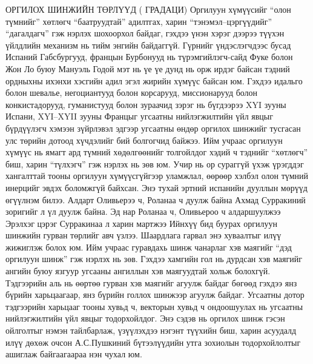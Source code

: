 ОРГИЛОХ ШИНЖИЙН ТӨРЛҮҮД ( ГРАДАЦИ)
Оргилуун хүмүүсийг “олон түмнийг” хөтлөгч “баатруудтай” адилтгах, харин “тэнэмэл–цэргүүдийг” “дагалдагч” гэж нэрлэх шохоорхол байдаг, гэхдээ үнэн хэрэг дээрээ түүхэн үйлдлийн механизм нь тийм энгийн байдаггүй. Гүрнийг үндэслэгчдээс бусад Испаний Габсбургууд, францын Бурбонууд нь түрэмгийлэгч-сайд Фуке болон Жон Ло буюу Мануэль Годой мэт нь үе үе дунд нь орж ирдэг байсан тэдний ордныхны ихэнхи хэсгийн адил эгэл жирийн хүмүүс байсан юм. Гэхдээ идальго болон шевалье, негоциантууд болон корсарууд, миссионарууд болон конкистадорууд, гуманистууд болон зураачид зэрэг нь бүгдээрээ XYI зууны Испани, XYI–XYII зууны Францыг угсаатны нийлэгжилтийн үйл явцыг бүрдүүлэгч хэмээн зүйрлэвэл эдгээр угсаатны өндөр оргилох шинжийг тусгасан улс төрийн дотоод хүчдэлийг бий болгогчид байжээ.
Ийм учраас оргилуун хүмүүс нь ямагт ард түмний хөдөлгөөнийг толгойлдог хэдий ч тэднийг “хөтлөгч” биш, харин “түлхэгч” гэж нэрлэх нь зөв юм. Учир нь ор сураггүй үхэж үрэгддэг хангалттай тооны оргилуун хүмүүсгүйгээр уламжлал, өөрөөр хэлбэл олон түмний инерцийг эвдэх боломжгүй байхсан. Энэ тухай эртний испанийн дууллын мөрүүд өгүүлнэм билээ.
Алдарт Оливьерээ ч, Роланаа ч дуулж байна
Ахмад Сурракиний зоригийг л үл дуулж байна.
Эд нар Роланаа ч, Оливьероо ч алдаршуулжээ
Эрэлхэг цэрэг Сурракинаа л харин мартжээ
Ийнхүү бид буурах оргилуун шинжийн гурван төрлийг авч үзлээ. Шаардлага гарвал энэ хуваалтыг илүү жижиглэж болох юм. Ийм учраас гуравдахь шинж чанарлаг хэв маягийг “дэд оргилуун шинж” гэж нэрлэх нь зөв. Гэхдээ хамгийн гол нь дурдсан хэв маягийг ангийн буюу язгуур угсааны ангиллын хэв маягуудтай хольж болохгүй. Тэдгээрийн аль нь өөртөө гурван хэв маягийг агуулж байдаг бөгөөд гэхдээ янз бүрийн харьцаагаар, янз бүрийн голлох шинжээр агуулж байдаг. Угсаатны дотор тэдгээрийн харьцааг тооны хувьд ч, векторын хувьд ч ондоошуулах нь угсаатны нийлэгжилтийн үйл явцыг тодорхойлдог.
Энэ сэдэв нь оргилох шинж гэсэн ойлголтыг нэмэн тайлбарлаж, үзүүлэхдээ нэгэнт түүхийн биш, харин асуудалд илүү дөхөж очсон А.С.Пушкиний бүтээлүүдийн утга зохиолын тодорхойлолтыг ашиглаж байгаагаараа нэн чухал юм.
